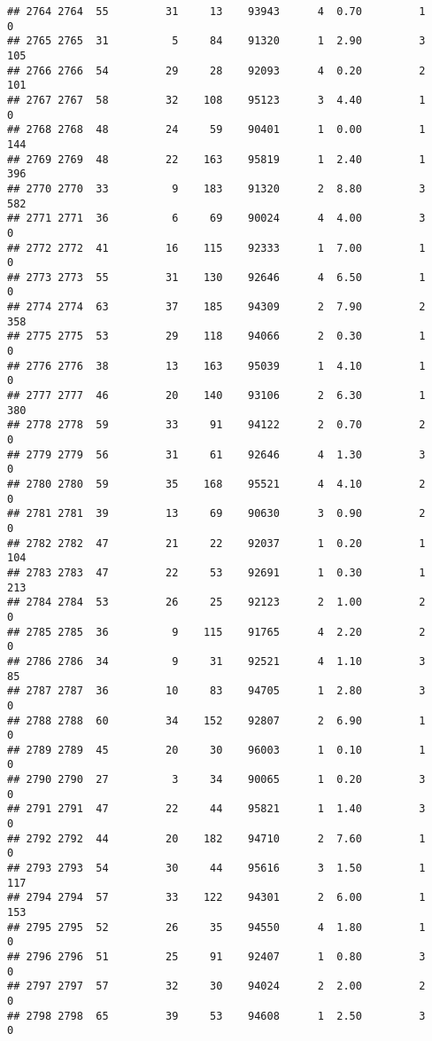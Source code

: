\documentclass[
]{article}
\begin{document}
\begin{verbatim}
## 2764 2764  55         31     13    93943      4  0.70         1        0
## 2765 2765  31          5     84    91320      1  2.90         3      105
## 2766 2766  54         29     28    92093      4  0.20         2      101
## 2767 2767  58         32    108    95123      3  4.40         1        0
## 2768 2768  48         24     59    90401      1  0.00         1      144
## 2769 2769  48         22    163    95819      1  2.40         1      396
## 2770 2770  33          9    183    91320      2  8.80         3      582
## 2771 2771  36          6     69    90024      4  4.00         3        0
## 2772 2772  41         16    115    92333      1  7.00         1        0
## 2773 2773  55         31    130    92646      4  6.50         1        0
## 2774 2774  63         37    185    94309      2  7.90         2      358
## 2775 2775  53         29    118    94066      2  0.30         1        0
## 2776 2776  38         13    163    95039      1  4.10         1        0
## 2777 2777  46         20    140    93106      2  6.30         1      380
## 2778 2778  59         33     91    94122      2  0.70         2        0
## 2779 2779  56         31     61    92646      4  1.30         3        0
## 2780 2780  59         35    168    95521      4  4.10         2        0
## 2781 2781  39         13     69    90630      3  0.90         2        0
## 2782 2782  47         21     22    92037      1  0.20         1      104
## 2783 2783  47         22     53    92691      1  0.30         1      213
## 2784 2784  53         26     25    92123      2  1.00         2        0
## 2785 2785  36          9    115    91765      4  2.20         2        0
## 2786 2786  34          9     31    92521      4  1.10         3       85
## 2787 2787  36         10     83    94705      1  2.80         3        0
## 2788 2788  60         34    152    92807      2  6.90         1        0
## 2789 2789  45         20     30    96003      1  0.10         1        0
## 2790 2790  27          3     34    90065      1  0.20         3        0
## 2791 2791  47         22     44    95821      1  1.40         3        0
## 2792 2792  44         20    182    94710      2  7.60         1        0
## 2793 2793  54         30     44    95616      3  1.50         1      117
## 2794 2794  57         33    122    94301      2  6.00         1      153
## 2795 2795  52         26     35    94550      4  1.80         1        0
## 2796 2796  51         25     91    92407      1  0.80         3        0
## 2797 2797  57         32     30    94024      2  2.00         2        0
## 2798 2798  65         39     53    94608      1  2.50         3        0

\end{verbatim}
\end{document}

